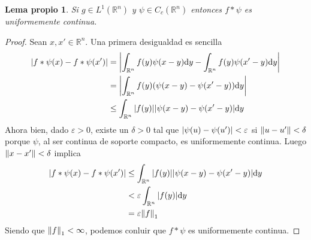 \documentclass{article}
\newcommand{\realNumbers}{\mathbb{R}}
\newtheorem{myLemma}{Lema propio}
\theoremstyle{remark}
\begin{document}
\begin{myLemma}
  \label{myLemma:convolutionWithCompactlySupportedFunction}
  Si \(g \in L^1(\realNumbers^n)\) y \(\psi \in C_c(\realNumbers^n)\) entonces \(f * \psi\) es uniformemente continua.
\end{myLemma}
\begin{proof}
  Sean \(x, x' \in \realNumbers^n\).
  Una primera desigualdad es sencilla
  \begin{align}
    \abs{f * \psi (x) - f * \psi (x')}
    &=
    \abs{
      \int_{\realNumbers^n} f(y) \psi(x - y) \dd y
      -
      \int_{\realNumbers^n} f(y) \psi(x' - y) \dd y
    }
    \\
    &=
    \abs{
      \int_{\realNumbers^n} f(y) (\psi(x - y) - \psi(x' - y)) \dd y
    }
    \\
    &\leq
    \int_{\realNumbers^n} \abs{f(y)} \abs{\psi(x - y) - \psi(x' - y)} \dd y
  \end{align}
  Ahora bien, dado \(\varepsilon > 0\), existe un \(\delta > 0\) tal que \(\abs{\psi(u) - \psi(u')} < \varepsilon\) si \(\norm{u - u'} < \delta\) porque \(\psi\), al ser continua de soporte compacto, es uniformemente continua.
  Luego \(\norm{x - x'} < \delta\) implica
  \begin{align}
    \abs{f * \psi (x) - f * \psi (x')}
    &\leq
    \int_{\realNumbers^n} \abs{f(y)} \abs{\psi(x - y) - \psi(x' - y)} \dd y
    \\
    &<
    \varepsilon \int_{\realNumbers^n} \abs{f(y)} \dd y
    \\
    &=
    \varepsilon \norm{f}_1
  \end{align}
  Siendo que \(\norm{f}_1 < \infty\), podemos conluir que \(f * \psi\) es uniformemente continua.
\end{proof}
\end{document}

